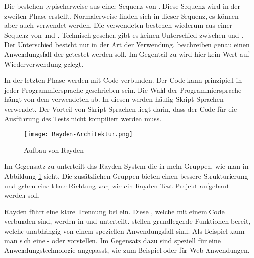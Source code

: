 \SuperPar
Die  bestehen typischerweise aus einer Sequenz von . Diese Sequenz wird in der zweiten Phase erstellt. Normalerweise finden sich  in dieser Sequenz, es können aber auch  verwendet werden. Die verwendeten  bestehen wiederum aus einer Sequenz von  und . Technisch gesehen gibt es keinen Unterschied zwischen  und . Der Unterschied besteht nur in der Art der Verwendung.  beschreiben genau einen Anwendungsfall der getestet werden soll. Im Gegenteil zu  wird hier kein Wert auf Wiederverwendung gelegt.

\SuperPar
In der letzten Phase werden  mit Code verbunden. Der Code kann prinzipiell in jeder Programmiersprache geschrieben sein. Die Wahl der Programmiersprache hängt von dem verwendeten  ab. In diesen  werden häufig Skript-Sprachen verwendet. Der Vorteil von Skript-Sprachen liegt darin, dass der Code für die Ausführung des Tests nicht kompiliert werden muss.

\begin{figure}[h]
\centering
\texttt{[image: Rayden-Architektur.png]}
\caption{Aufbau von Rayden}
\label{fig:rayden-arch}
\end{figure}

\SuperPar
Im Gegensatz zu  unterteilt das Rayden-System die  in mehr Gruppen, wie man in Abbildung \ref{fig:rayden-arch} sieht. Die zusätzlichen Gruppen bieten einen bessere Strukturierung und geben eine klare Richtung vor, wie ein Rayden-Test-Projekt aufgebaut werden soll.    

\SuperPar
Rayden führt eine klare Trennung bei  ein. Diese , welche mit einem Code verbunden sind, werden in  und  unterteilt.  stellen grundlegende Funktionen bereit, welche unabhängig von einem speziellen Anwendungsfall sind. Als Beispiel kann man sich eine - oder  vorstellen. Im Gegensatz dazu sind  speziell für eine Anwendungstechnologie angepasst, wie zum Beispiel  oder  für Web-Anwendungen. 


